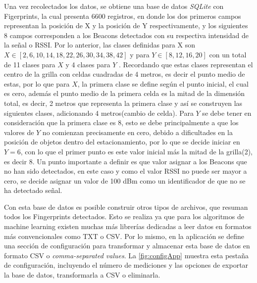 Una vez recolectados los datos, se obtiene una base de datos \textit{SQLite} con Figerprints, la cual presenta 6600 registros, en donde los dos primeros campos representan la posición de X y la posición de Y respectivamente, y los siguientes 8 campos corresponden a los Beacons detectados con su respectiva intensidad de la señal o RSSI. Por lo anterior, las clases definidas para X son $ X \in [2, 6, 10, 14, 18, 22, 26, 30 , 34, 38, 42]$ y para $Y \in [8, 12, 16, 20]$ con  un total de 11 clases para $X$ y 4 clases para $Y$ . Recordando que estas clases representan el centro de la grilla con celdas cuadradas de 4 metros, es decir el punto medio de estas, por lo que para $ X$, la primera clase se define según el punto inicial, el cual es cero, además el  punto medio de la primera celda es la mitad de la dimensión total, es decir, 2 metros que representa la primera clase y así se construyen las siguientes clases, adicionando 4 metros(cambio de celda). Para $Y$ se debe tener en consideración que la primera clase es 8, esto se debe principalmente a que los valores de $ Y$ no comienzan precisamente en cero, debido a dificultades en la posición de objetos dentro del estacionamiento, por lo que se decide iniciar en $Y = 6$, con lo que el primer punto es este valor inicial más la mitad de la grilla(2), es decir 8.  Un punto importante a definir es que valor asignar a los Beacons que no han sido detectados, en este caso y como el valor RSSI no puede ser mayor a cero, se decide asignar un valor de 100 dBm como un identificador de que no se ha detectado señal.

Con esta base de datos es posible construir otros tipos de archivos, que resuman todos los Fingerprints detectados. Esto se realiza ya que para los algoritmos de machine learning existen muchas más librerías dedicadas a leer datos en formatos más convencionales como TXT o CSV. Por lo mismo, en la aplicación se define una sección de configuración para transformar y almacenar esta base de datos en formato CSV o \textit{comma-separated values}.  La \autoref{fig:configApp} muestra esta pestaña de configuración, incluyendo el número de mediciones y las opciones de exportar la base de datos, transformarla a CSV o eliminarla.

